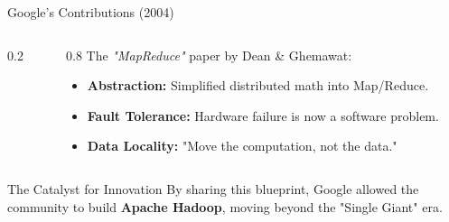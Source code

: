 \begin{frame}{Google's Contributions (2004)}
    \begin{columns}
        \begin{column}{0.2\textwidth}
            \centering
        \end{column}
        \begin{column}{0.8\textwidth}
            The \textit{"MapReduce"} paper by Dean \& Ghemawat:
            \begin{itemize}
                \item \textbf{Abstraction:} Simplified distributed math into Map/Reduce.
                \item \textbf{Fault Tolerance:} Hardware failure is now a software problem.
                \item \textbf{Data Locality:} "Move the computation, not the data."
            \end{itemize}
        \end{column}
    \end{columns}
    
    \vfill
    \begin{alertblock}{The Catalyst for Innovation}
        By sharing this blueprint, Google allowed the community to build \textbf{Apache Hadoop}, moving beyond the "Single Giant" era.
    \end{alertblock}
\end{frame}

